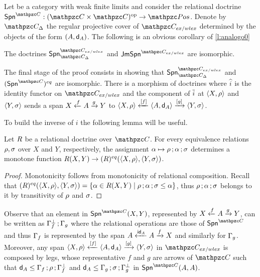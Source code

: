 Let \CC be a category with weak finite limits and consider the relational doctrine $\fun{\Span\CC}{\bop\CC}{\Pos}$. 
Denote by  $\ct{C}_\Delta$ the regular projective cover of $\CC_{ex/wlex}$ determined by the objects of the form $(A,\mathsf{d}_A)$. The following is an obvious corollary of \cref{l:analogo0} 

\begin{corollary}\label{c:analogo}
The doctrines $\Span{\ct{C_{ex/wlex}}}_{\ct{C}_\Delta}$ and $\jmSpan{\ct{C_{ex/wlex}}}$ are isomorphic.
\end{corollary}

The final stage of the proof consists in showing that $\Span{\ct{C_{ex/wlex}}}_{\ct{C}_\Delta}$ and $\EQR{\Span\CC}$ are isomorphic.
There is a morphism of doctrines  where $\widehat{i}$ is the identity functor on $\ct{C_{ex/wlex}}$ and the component of $\overline{i}$ at ${\langle X,\rho \rangle }$ and ${\langle Y,\sigma \rangle }$ sends a span $X \xleftarrow{f} A \xrightarrow{g} Y$ to ${\langle X,\rho \rangle } \xleftarrow{[f]} {\langle A,\mathsf{d}_A \rangle } \xrightarrow{[g]} {\langle Y,\sigma \rangle }$. 

To build the inverse of $i$ the following lemma will be useful.

\begin{lemma} \label{l:chiudo} 
Let $R$ be a relational doctrine over $\CC$. For every equivalence relations $\rho, \sigma$ over $X$ and $Y$, respectively, the assignment $\alpha\mapsto \rho\mathop{\mathbf{;}}\alpha\mathop{\mathbf{;}}\sigma$ determines a monotone function $\fun{}{\RDoc(X,Y)}{\EQR\RDoc(\ple{X,\eqrelr},\ple{Y,\eqrels})}$.
\end{lemma}
\begin{proof} 
Monotonicity follows from monotonicity of relational composition. Recall that $(R)^{eq}({\langle X,\rho \rangle },{\langle Y,\sigma \rangle })= \{ \alpha\in R(X,Y) \mid \rho\mathop{\mathbf{;}}\alpha\mathop{\mathbf{;}}\sigma\leq\alpha \}$, thus $\rho\mathop{\mathbf{;}}\alpha\mathop{\mathbf{;}}\sigma$ belongs to it by transitivity of $\rho$ and $\sigma$.
\end{proof}

Observe that an element  in $\Span{\CC}(X,Y)$, represented by $X \xleftarrow{f} A \xrightarrow{g} Y$, can be written as $\Gamma_{f}^{\bot}\mathop{\mathbf{;}}\Gamma_{g}$ where the relational operations are those of $\Span{\CC}$ and thus $\Gamma_{f}$ is represented by the span 
$A \xleftarrow{\mathsf{id}_A} A \xrightarrow{f} X$ and similarly for $\Gamma_{g}$. 
Moreover, any span ${\langle X,\rho \rangle } \xleftarrow{[f]} {\langle A,\mathsf{d}_A \rangle } \xrightarrow{[g]} {\langle Y,\sigma \rangle }$ 
in $\ct{C_{ex/wlex}}$ is composed by legs, whose representative $f$ and $g$ are arrows of $\CC$ such that $\mathsf{d}_A\leq\Gamma_{f}\mathop{\mathbf{;}}\rho\mathop{\mathbf{;}}\Gamma_{f}^{\bot}$ and $\mathsf{d}_A\leq\Gamma_{g}\mathop{\mathbf{;}}\sigma\mathop{\mathbf{;}}\Gamma_{g}^{\bot}$ in $\Span{\CC}(A,A)$.

